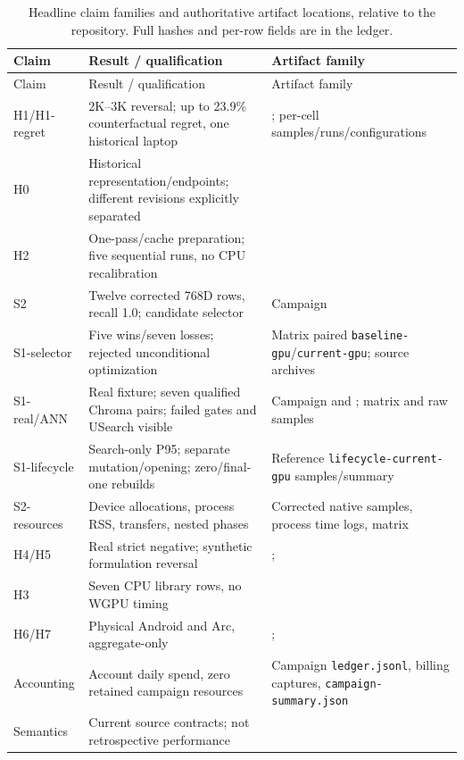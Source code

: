 \begin{longtable}{L{.17\linewidth}L{.37\linewidth}L{.35\linewidth}}
\caption{Headline claim families and authoritative artifact locations, relative to the repository. Full hashes and per-row fields are in the ledger.}\\
\toprule Claim & Result / qualification & Artifact family \\\midrule\endfirsthead
\toprule Claim & Result / qualification & Artifact family \\\midrule\endhead
H1/H1-regret & 2K--3K reversal; up to 23.9\% counterfactual regret, one historical laptop & ; per-cell samples/runs/configurations \\
H0 & Historical representation/endpoints; different revisions explicitly separated &  \\
H2 & One-pass/cache preparation; five sequential runs, no CPU recalibration &  \\
S2 & Twelve corrected 768D rows, recall 1.0; candidate selector & Campaign  \\
S1-selector & Five wins/seven losses; rejected unconditional optimization & Matrix paired \texttt{baseline-gpu}/\texttt{current-gpu}; source archives \\
S1-real/ANN & Real fixture; seven qualified Chroma pairs; failed gates and USearch visible & Campaign  and ; matrix and raw samples \\
S1-lifecycle & Search-only P95; separate mutation/opening; zero/final-one rebuilds & Reference \texttt{lifecycle-current-gpu} samples/summary \\
S2-resources & Device allocations, process RSS, transfers, nested phases & Corrected native samples, process time logs, matrix \\
H4/H5 & Real strict negative; synthetic formulation reversal & ;  \\
H3 & Seven CPU library rows, no WGPU timing &  \\
H6/H7 & Physical Android and Arc, aggregate-only & ;  \\
Accounting & Account daily spend, zero retained campaign resources & Campaign \texttt{ledger.jsonl}, billing captures, \texttt{campaign-summary.json} \\
Semantics & Current source contracts; not retrospective performance &  \\
\bottomrule\end{longtable}

